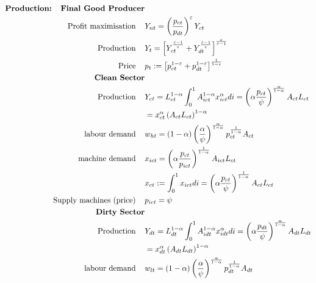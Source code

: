 \begin{align*}
\text{\textbf{Production:}} \hspace{4mm}
\text{\textbf{Final Good Producer}}&\\
\text{Profit maximisation}\hspace{4mm} & Y_{nt}=\left(\frac{p_{ct}}{p_{dt}}\right)^\varepsilon Y_{ct}\\
\text{Production}\hspace{4mm} & Y_t=\left[Y_{ct}^{\frac{\varepsilon-1}{\varepsilon}}+Y_{dt}^{\frac{\varepsilon-1}{\varepsilon}}\right]^{\frac{\varepsilon}{\varepsilon-1}}\\
\text{Price}\hspace{4mm}& p_t:=\left[p_{ct}^{1-\varepsilon}+p_{dt}^{1-\varepsilon}\right]^{\frac{1}{1-\varepsilon}}\\
\text{\textbf{Clean Sector}}\\
\text{Production}\hspace{4mm}& Y_{ct}=L^{1-\alpha}_{ct}\int_{0}^{1}A^{1-\alpha}_{ict}x_{ict}^{\alpha}di=  \left(\alpha\frac{p_{ct}}{\psi}\right)^{\frac{\alpha}{1-\alpha}}A_{ct} L_{ct}
\\ & =x_{ct}^{\alpha}\left(A_{ct}L_{ct}\right)^{1-\alpha} \\ 
\text{labour demand}\hspace{4mm} & w_{ht} =
(1-\alpha)\left(\frac{\alpha}{\psi}\right)^\frac{\alpha}{1- \alpha}p_{ct}^\frac{1}{1-\alpha}A_{ct}\\
\text{machine demand}\hspace{4mm} & x_{ict} = \left(\alpha\frac{ p_{ct}}{p_{ict}}\right)^\frac{1}{1-\alpha}A_{ict}L_{ct}\\
& x_{ct}:=\int_{0}^{1}x_{ict} di= \left(\alpha\frac{p_{ct}}{\psi}\right)^\frac{1}{1-\alpha}A_{ct}L_{ct}\\
%
\text{Supply machines (price)}\hspace{4mm}& p_{ict}=\psi \\
%
\text{\textbf{Dirty Sector}}\\
\text{Production}\hspace{4mm} & Y_{dt}=L^{1-\alpha}_{dt}\int_{0}^{1}A^{1-\alpha}_{idt}x_{idt}^{\alpha}di=  \left(\alpha\frac{p_{dt}}{\psi}\right)^{\frac{\alpha}{1-\alpha}}A_{dt} L_{dt}\\ & =x_{dt}^{\alpha}\left(A_{dt}L_{dt}\right)^{1-\alpha} \\ 
\text{labour demand}\hspace{4mm} & w_{lt} =
(1-\alpha)\left(\frac{\alpha}{\psi}\right)^\frac{\alpha}{1- \alpha}p_{dt}^\frac{1}{1-\alpha}A_{dt}\\

\end{align*}
